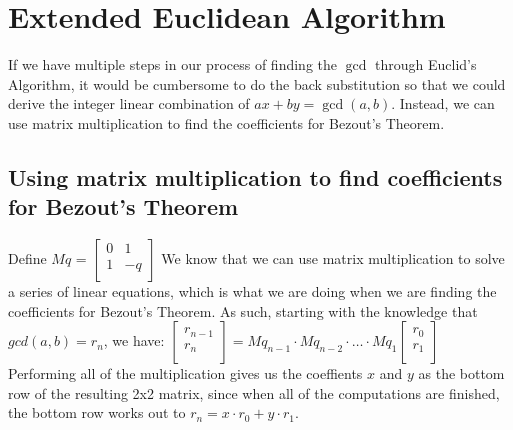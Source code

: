 \documentclass[10pt]{article}
\theoremstyle{definition}
\theoremstyle{remark}
\begin{document}
\section{Extended Euclidean Algorithm}
If we have multiple steps in our process of finding the $\gcd$ through Euclid's Algorithm, it would be cumbersome to do the back substitution so that we could derive the integer linear combination of $ax + by = \gcd(a,b)$.  Instead, we can use matrix multiplication to find the coefficients for Bezout's Theorem.
\subsection{Using matrix multiplication to find coefficients for Bezout’s Theorem}
Define $Mq$ = $\left[
\begin{array}{cc}
0 & 1 \\
1 & -q\\
\end{array}
\right]$
We know that we can use matrix multiplication to solve a series of linear equations, which is what we are doing when we are finding the coefficients for Bezout's Theorem.  As such, starting with the knowledge that $gcd(a,b) = r_n$, we have:
$\left[\begin{array}{c}r_{n-1}\\r_n\\\end{array}\right] = Mq_{n-1} \cdot Mq_{n-2} \cdot \ldots \cdot Mq_1 \left[\begin{array}{c}r_0\\r_1\\\end{array}\right]$\\

Performing all of the multiplication gives us the coeffients $x$ and $y$ as the bottom row of the resulting 2x2 matrix, since when all of the computations are finished, the bottom row works out to $r_n = x\cdot r_0 + y\cdot r_1$.
\end{document}
